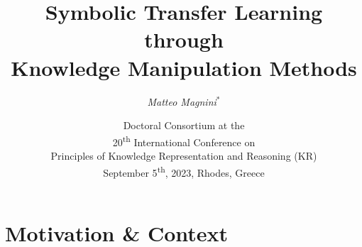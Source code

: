 \documentclass[presentation]{beamer}\mode<presentation>{\usetheme{blackAMSBolognaFC}}
\title[Symbolic Transfer Learning]{
    Symbolic Transfer Learning through
    \\
    Knowledge Manipulation Methods
}
\author[Magnini]{
	\emph{Matteo Magnini}$^{*}$ %
}
\institute[UniBo]{
    $^{*}$Dipartimento di Informatica -- Scienza e Ingegneria (DISI)
    \\
    \textsc{Alma Mater Studiorum} -- Università di Bologna
    \\
    \texttt{
        \emph{matteo.magnini}@unibo.it %
    }
}
\date[DC KR 2023]{
	Doctoral Consortium at the
    \\
    20\textsuperscript{th} International Conference on
	\\
	Principles of Knowledge Representation and Reasoning (KR)
	\\
	September 5\textsuperscript{th}, 2023, Rhodes, Greece
}
\begin{document}

\frame{\titlepage}

\section{Motivation \& Context}
\end{document}
